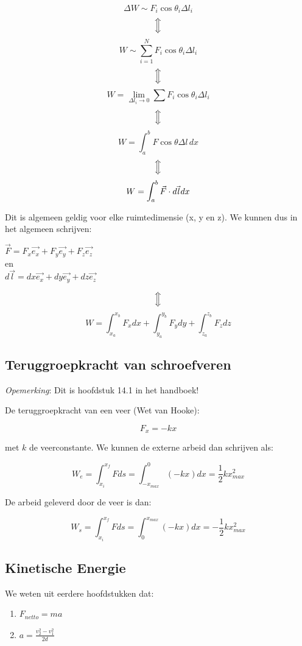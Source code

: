 \documentclass[12pt,a4paper]{article}
\newcommand{\Luda}{\Big\Updownarrow}
\begin{document}
    $$\Delta W \sim F_{i}\cos{\theta_{i}}\Delta l_{i}$$
    $$\Luda$$
    $$W \sim \sum_{i = 1}^{N} F_{i}\cos{\theta_{i}}\Delta l_{i}$$
    $$\Luda$$
    $$W = \lim_{\Delta l_{i} \to 0}\sum F_{i}\cos{\theta_{i}}\Delta l_{i}$$
    $$\Luda$$
    $$W = \int_{a}^{b} F\cos{\theta}\Delta l \,dx $$ 
    $$\Luda$$
    $$W = \int_{a}^{b} \vec{F} \cdot d\vec{\emph{l}} \, dx $$
    
    Dit is algemeen geldig voor elke ruimtedimensie (x, y en z). We kunnen dus in het algemeen schrijven:
    
    \begin{center}
    	$\vec{F} = F_{x}\vec{e_{x}} + F_{y}\vec{e_{y}} + F_{z}\vec{e_{z}}$\\
     	en\\
   	$d\vec{l} = dx\vec{e_{x}} + dy\vec{e_{y}} + dz\vec{e_{z}} $\\
   \end{center}
    $$\Luda$$	
    $$W = \int_{x_{a}}^{x_{b}} F_{x}dx + \int_{y_{a}}^{y_{b}} F_{y}dy + \int_{z_{a}}^{z_{b}} F_{z}dz$$
    
    \subsection{Teruggroepkracht van schroefveren}
    \emph{Opemerking}: Dit is hoofdstuk 14.1 in het handboek!
   
    De teruggroepkracht van een veer (Wet van Hooke): 
    
    $$ F_{x} = -kx $$ 
    
    met $k$ de veerconstante. We kunnen de externe arbeid dan schrijven als:
    
    $$W_{e} = \int_{x_{i}}^{x_{f}} Fds = \int_{-x_{max}}^{0}(-kx)dx = \frac{1}{2}kx^{2}_{max}$$
    
    De arbeid geleverd door de veer is dan:
    
    $$W_{s} = \int_{x_{i}}^{x_{f}} Fds = \int_{0}^{x_{max}}(-kx)dx = -\frac{1}{2}kx^{2}_{max}$$
    
    \subsection{Kinetische Energie}
    We weten uit eerdere hoofdstukken dat:
    
    \begin{enumerate}
    	\item $F_{netto} = ma$
    	\item $a = \frac{v_{2}^{2} - v_{1}^{2}}{2d}$
    \end{enumerate}
    
\end{document}
